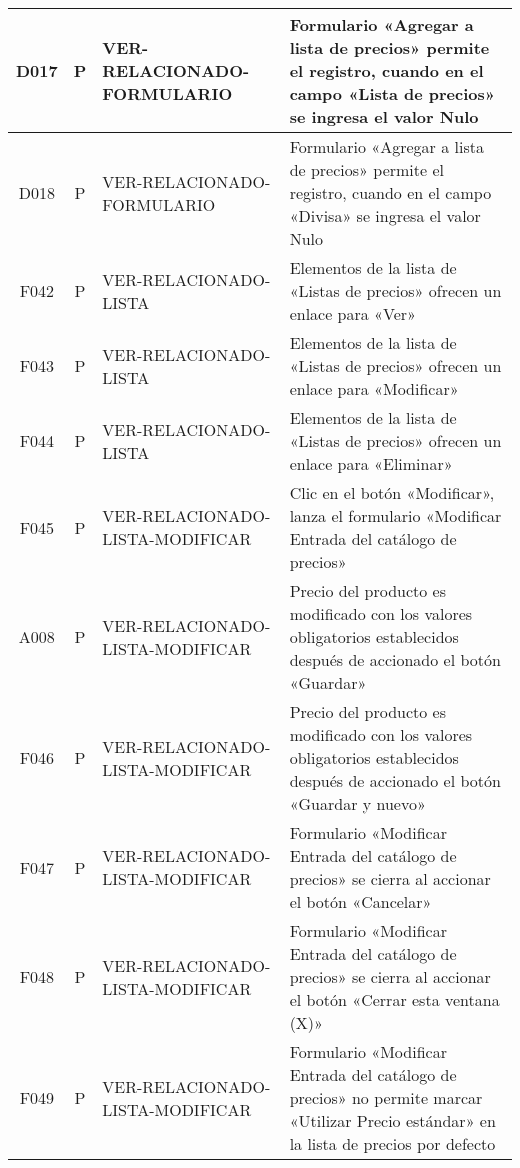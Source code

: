 \begin{landscape}
{\begin{longtable}[htb]{|c|c|p{3.8cm}|p{15.2cm}|}
\scriptsize{D017} & \scriptsize{P} & \scriptsize{VER-RELACIONADO-FORMULARIO} & \scriptsize{Formulario «Agregar a lista de precios» permite el registro, cuando en el campo «Lista de precios» se ingresa el valor Nulo} \\ \hline
\scriptsize{D018} & \scriptsize{P} & \scriptsize{VER-RELACIONADO-FORMULARIO} & \scriptsize{Formulario «Agregar a lista de precios» permite el registro, cuando en el campo «Divisa» se ingresa el valor Nulo} \\ \hline
\scriptsize{F042} & \scriptsize{P} & \scriptsize{VER-RELACIONADO-LISTA} & \scriptsize{Elementos de la lista de «Listas de precios» ofrecen un enlace para «Ver»} \\ \hline
\scriptsize{F043} & \scriptsize{P} & \scriptsize{VER-RELACIONADO-LISTA} & \scriptsize{Elementos de la lista de «Listas de precios» ofrecen un enlace para «Modificar»} \\ \hline
\scriptsize{F044} & \scriptsize{P} & \scriptsize{VER-RELACIONADO-LISTA} & \scriptsize{Elementos de la lista de «Listas de precios» ofrecen un enlace para «Eliminar»} \\ \hline
\scriptsize{F045} & \scriptsize{P} & \scriptsize{VER-RELACIONADO-LISTA-MODIFICAR} & \scriptsize{Clic en el botón «Modificar», lanza el formulario «Modificar Entrada del catálogo de precios»} \\ \hline
\scriptsize{A008} & \scriptsize{P} & \scriptsize{VER-RELACIONADO-LISTA-MODIFICAR} & \scriptsize{Precio del producto es modificado con los valores obligatorios establecidos después de accionado el botón «Guardar»} \\ \hline
\scriptsize{F046} & \scriptsize{P} & \scriptsize{VER-RELACIONADO-LISTA-MODIFICAR} & \scriptsize{Precio del producto es modificado con los valores obligatorios establecidos después de accionado el botón «Guardar y nuevo»} \\ \hline
\scriptsize{F047} & \scriptsize{P} & \scriptsize{VER-RELACIONADO-LISTA-MODIFICAR} & \scriptsize{Formulario «Modificar Entrada del catálogo de precios» se cierra al accionar el botón «Cancelar»} \\ \hline
\scriptsize{F048} & \scriptsize{P} & \scriptsize{VER-RELACIONADO-LISTA-MODIFICAR} & \scriptsize{Formulario «Modificar Entrada del catálogo de precios» se cierra al accionar el botón «Cerrar esta ventana (X)»} \\ \hline
\scriptsize{F049} & \scriptsize{P} & \scriptsize{VER-RELACIONADO-LISTA-MODIFICAR} & \scriptsize{Formulario «Modificar Entrada del catálogo de precios» no permite marcar «Utilizar Precio estándar» en la lista de precios por defecto} \\ \hline

\end{longtable}}
\end{landscape}
